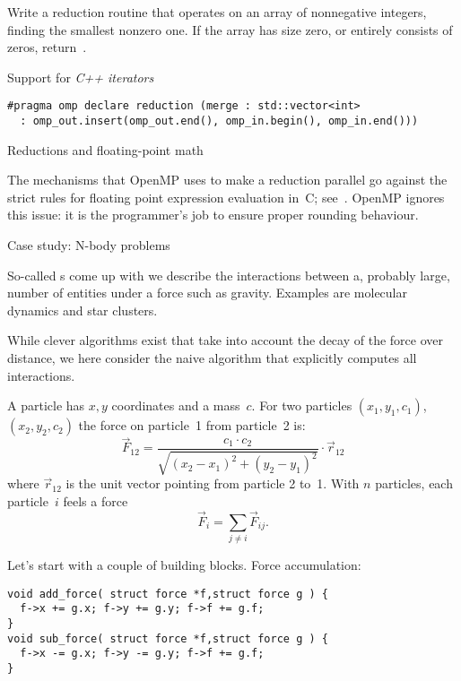 \begin{exercise}
  Write a reduction routine that operates on an array of nonnegative
  integers, finding the smallest nonzero one. If the array has size
  zero, or entirely consists of zeros, return~.
\end{exercise}

Support for
\emph{C++ iterators}
\begin{lstlisting}
#pragma omp declare reduction (merge : std::vector<int>
  : omp_out.insert(omp_out.end(), omp_in.begin(), omp_in.end())) 
\end{lstlisting}


 {Reductions and floating-point math}

The mechanisms that OpenMP uses to make a reduction parallel go
against the strict rules for floating point expression evaluation in~C;
see~. OpenMP ignores this issue: it is the
programmer's job to ensure proper rounding behaviour.

 {Case study: N-body problems}

So-called s come up with
we describe the interactions between a,
probably large,
number of entities under a force such as gravity.
Examples are molecular dynamics and star clusters.

While clever algorithms exist that take into account the
decay of the force over distance,
we here consider the naive algorithm that
explicitly computes all interactions.

A particle has $x,y$ coordinates and a mass~$c$.
For two particles $(x_1,y_1,c_1)$, $(x_2,y_2,c_2)$
the force on particle~1 from particle~2 is:
\[ \overrightarrow F_{12} = \frac{c_1\cdot c_2}{\sqrt{ (x_2-x_1)^2+(y_2-y_1)^2 }} \cdot \overrightarrow r_{12} \]
where $\overrightarrow r_{12}$ is the unit vector pointing from particle 2 to~1.
With $n$ particles, each particle~$i$ feels a force
\[ \overrightarrow F_i = \sum_{j\not=i} \overrightarrow F_{ij}.\]

Let's start with a couple of building blocks.
Force accumulation:
\begin{lstlisting}
void add_force( struct force *f,struct force g ) {
  f->x += g.x; f->y += g.y; f->f += g.f;
}
void sub_force( struct force *f,struct force g ) {
  f->x -= g.x; f->y -= g.y; f->f += g.f;
}
\end{lstlisting}

